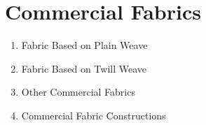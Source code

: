 \section{Commercial Fabrics}

\begin{enumerate}[label=\textbf{\Alph*.}]
    \item Fabric Based on Plain Weave
    \item Fabric Based on Twill Weave
    \item Other Commercial Fabrics
    \item Commercial Fabric Constructions
\end{enumerate}